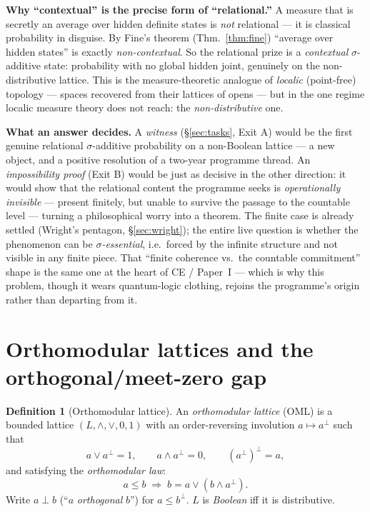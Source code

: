\documentclass[11pt]{article}
\theoremstyle{definition}
\newtheorem{definition}[theorem]{Definition}
\theoremstyle{remark}
\begin{document}
\medskip
\noindent\textbf{Why ``contextual'' is the precise form of ``relational.''} A
measure that is secretly an average over hidden definite states is \emph{not}
relational --- it is classical probability in disguise. By Fine's theorem
(Thm.~\ref{thm:fine}) ``average over hidden states'' is exactly
\emph{non-contextual}. So the relational prize is a \emph{contextual}
$\sigma$-additive state: probability with no global hidden joint, genuinely on the
non-distributive lattice. This is the measure-theoretic analogue of \emph{localic}
(point-free) topology --- spaces recovered from their lattices of opens --- but in
the one regime localic measure theory does not reach: the \emph{non-distributive}
one.

\medskip
\noindent\textbf{What an answer decides.} A \emph{witness}
(\S\ref{sec:tasks}, Exit A) would be the first genuine relational $\sigma$-additive
probability on a non-Boolean lattice --- a new object, and a positive resolution of
a two-year programme thread. An \emph{impossibility proof} (Exit B) would be just
as decisive in the other direction: it would show that the relational content the
programme seeks is \emph{operationally invisible} --- present finitely, but unable
to survive the passage to the countable level --- turning a philosophical worry
into a theorem. The finite case is already settled (Wright's pentagon,
\S\ref{sec:wright}); the entire live question is whether the phenomenon can be
\emph{$\sigma$-essential}, i.e.\ forced by the infinite structure and not visible in
any finite piece. That ``finite coherence vs.\ the countable commitment'' shape is
the same one at the heart of CE / Paper~I --- which is why this problem, though it
wears quantum-logic clothing, rejoins the programme's origin rather than departing
from it.

\section{Orthomodular lattices and the orthogonal/meet-zero gap}

\begin{definition}[Orthomodular lattice]\label{def:oml}
An \emph{orthomodular lattice} (OML) is a bounded lattice $(L,\wedge,\vee,0,1)$
with an order-reversing involution $a\mapsto a^{\perp}$ such that
\[
  a\vee a^{\perp}=1,\qquad a\wedge a^{\perp}=0,\qquad (a^{\perp})^{\perp}=a,
\]
and satisfying the \emph{orthomodular law}:
\[
  a\le b \;\Longrightarrow\; b = a \vee (b\wedge a^{\perp}).
\]
Write $a\perp b$ (``$a$ \emph{orthogonal} $b$'') for $a\le b^{\perp}$. $L$ is
\emph{Boolean} iff it is distributive.
\end{definition}
\end{document}
